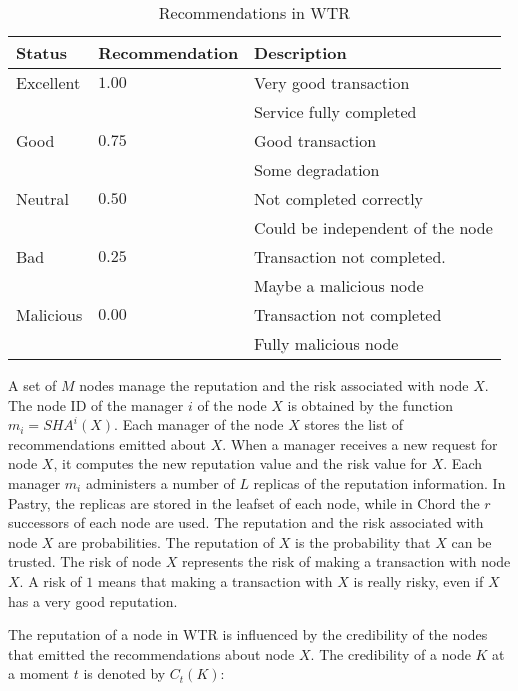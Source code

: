   \begin{table}
    \centering
    \footnotesize
    \begin{tabular}{|l|l|l|}
      \hline
      \textbf{Status} & \textbf{Recommendation} & \textbf{Description}\\
      \hline
      Excellent  & $1.00$    & Very good transaction\\
                &           & Service fully completed\\
      Good      & $0.75$    & Good transaction\\
                &           & Some degradation\\
      Neutral   & $0.50$     & Not completed correctly\\
                &           & Could be independent of the node\\
      Bad       & $0.25$    & Transaction not completed.\\
                &           & Maybe a malicious node\\
      Malicious & $0.00$    & Transaction not completed\\
                &           & Fully malicious node\\
      \hline
    \end{tabular}
    \caption{Recommendations in WTR}
    \label{table:wtr_recomendations}
  \end{table}

A set of $M$ nodes manage the reputation and the risk associated with node $X$.
The node ID of the manager $i$ of the node $X$ is
obtained by the function $m_i = SHA^{i}(X)$. Each manager of the node $X$
stores the list of recommendations emitted about $X$. When a manager receives a
new request for node $X$, it computes the new reputation value and the risk
value for $X$.
Each manager $m_i$ administers a number of $L$ replicas of the reputation information. In Pastry,
the replicas are stored in the leafset of each node, while in Chord the $r$
successors of each node are used.
The reputation and the risk associated with node $X$ are probabilities. The
reputation of $X$ is the probability that $X$ can be trusted. The risk of node
$X$ represents the risk of making a transaction with node $X$. A risk of $1$
means that making a transaction with $X$ is really risky, even if $X$ has a very
good reputation.

The reputation of a node in WTR is influenced by the credibility of the nodes
that emitted the recommendations about node $X$. The credibility of a node $K$ at a
moment $t$ is denoted by $C_t (K)$:%

